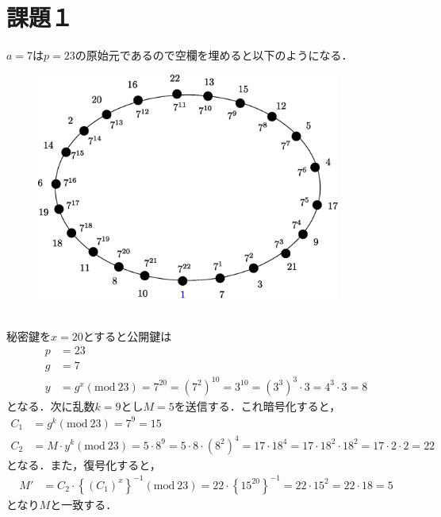 \documentclass[a4paper,12pt]{jarticle}
\begin{document}
%
\title{\vspace{-30mm} }
\date{}
%
\maketitle
%
\vspace{-30mm}
%
\setlength{\abovedisplayskip}{0pt} %
\setlength{\belowdisplayskip}{0pt} %

\section*{課題１}
\vspace{-4mm}
$a=7$は$p=23$の原始元であるので空欄を埋めると以下のようになる．
%
\begin{figure}[hbp]
 \begin{center}
  \includegraphics[width=100mm]{fig/elga.eps}
 \end{center}
 \label{fig:elga}
\end{figure}
%
\\秘密鍵を$x=20$とすると公開鍵は
%
\begin{align}
 p&=23 \\
 g&=7 \\
 y&=g^x (\mathrm{mod}~23)=7^{20}=(7^2)^{10}=3^{10}=(3^3)^3\cdot3=4^3\cdot3=8
\end{align}
%
となる．次に乱数$k=9$とし$M=5$を送信する．これ暗号化すると，
%
\begin{align}
 C_1&=g^k (\mathrm{mod}~23)=7^9=15\\
 C_2&=M \cdot y^k (\mathrm{mod}~23)=5\cdot8^9=5\cdot8 \cdot(8^2)^4 =17\cdot18^4=17\cdot18^2\cdot18^2 =17\cdot2\cdot2=22 
\end{align}
%
となる．また，復号化すると，
%
\begin{align}
 M'&=C_2\cdot \left\{ (C_1)^x \right\}^{-1} (\mathrm{mod}~23)=22\cdot \left\{15^{20}\right\}^{-1} =22\cdot 15^2=22\cdot18=5
\end{align}
%
となり$M$と一致する．
\vspace{-5mm}
\end{document}
